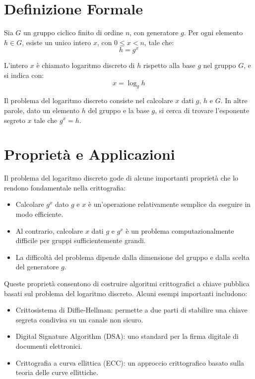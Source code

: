 \documentclass[a4paper,12pt]{report}
\begin{document}
%
%
%
%
\section{Definizione Formale}
Sia $G$ un gruppo ciclico finito di ordine $n$, con generatore $g$. Per ogni elemento $h \in G$, esiste un unico intero $x$, con $0 \leq x < n$, tale che:
\[h = g^x\]

L'intero $x$ è chiamato logaritmo discreto di $h$ rispetto alla base $g$ nel gruppo $G$, e si indica con:
\[x = \log_g h\]

Il problema del logaritmo discreto consiste nel calcolare $x$ dati $g$, $h$ e $G$. In altre parole, dato un elemento $h$ del gruppo e la base $g$, si cerca di trovare l'esponente segreto $x$ tale che $g^x = h$.

\section{Proprietà e Applicazioni}
Il problema del logaritmo discreto gode di alcune importanti proprietà che lo rendono fondamentale nella crittografia:

\begin{itemize}
    \item Calcolare $g^x$ dato $g$ e $x$ è un'operazione relativamente semplice da eseguire in modo efficiente.
    \item Al contrario, calcolare $x$ dati $g$ e $g^x$ è un problema computazionalmente difficile per gruppi sufficientemente grandi.
    \item La difficoltà del problema dipende dalla dimensione del gruppo e dalla scelta del generatore $g$.
\end{itemize}

Queste proprietà consentono di costruire algoritmi crittografici a chiave pubblica basati sul problema del logaritmo discreto. Alcuni esempi importanti includono:

\begin{itemize}
    \item Crittosistema di Diffie-Hellman: permette a due parti di stabilire una chiave segreta condivisa su un canale non sicuro.
    \item Digital Signature Algorithm (DSA): uno standard per la firma digitale di documenti elettronici.
    \item Crittografia a curva ellittica (ECC): un approccio crittografico basato sulla teoria delle curve ellittiche.
\end{itemize}
\end{document}
